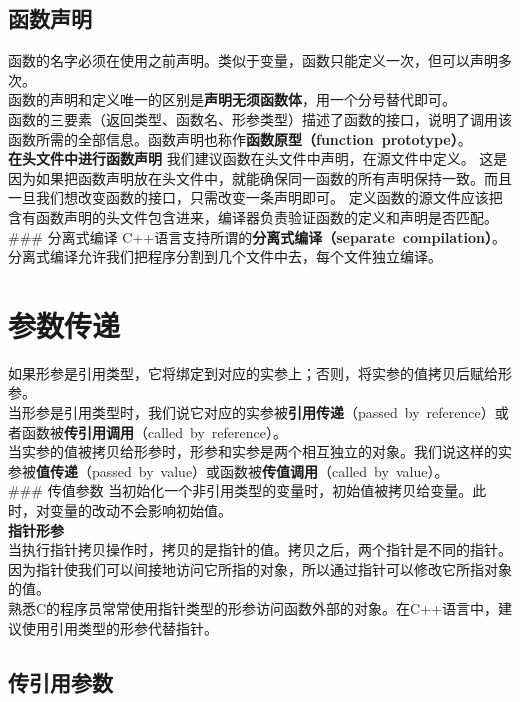 \documentclass[
  a4paper,
  oneside,tablecaptionabove
]{scrbook}
\begin{document}
\subsection{函数声明}\label{ux51fdux6570ux58f0ux660e}

函数的名字必须在使用之前声明。类似于变量，函数只能定义一次，但可以声明多次。\\
函数的声明和定义唯一的区别是\textbf{声明无须函数体}，用一个分号替代即可。\\
函数的三要素（返回类型、函数名、形参类型）描述了函数的接口，说明了调用该函数所需的全部信息。函数声明也称作\textbf{函数原型（function~prototype）}。\\
\textbf{在头文件中进行函数声明}
我们建议函数在头文件中声明，在源文件中定义。
这是因为如果把函数声明放在头文件中，就能确保同一函数的所有声明保持一致。而且一旦我们想改变函数的接口，只需改变一条声明即可。
定义函数的源文件应该把含有函数声明的头文件包含进来，编译器负责验证函数的定义和声明是否匹配。\\
\#\#\# 分离式编译
C++语言支持所谓的\textbf{分离式编译（separate~compilation）}。分离式编译允许我们把程序分割到几个文件中去，每个文件独立编译。

\section{参数传递}\label{ux53c2ux6570ux4f20ux9012}

如果形参是引用类型，它将绑定到对应的实参上；否则，将实参的值拷贝后赋给形参。\\
当形参是引用类型时，我们说它对应的实参被\textbf{引用传递}（passed~by~reference）或者函数被\textbf{传引用调用}（called~by~reference）。\\
当实参的值被拷贝给形参时，形参和实参是两个相互独立的对象。我们说这样的实参被\textbf{值传递}（passed~by~value）或函数被\textbf{传值调用}（called~by~value）。\\
\#\#\# 传值参数
当初始化一个非引用类型的变量时，初始值被拷贝给变量。此时，对变量的改动不会影响初始值。\\
\textbf{指针形参}\\
当执行指针拷贝操作时，拷贝的是指针的值。拷贝之后，两个指针是不同的指针。因为指针使我们可以间接地访问它所指的对象，所以通过指针可以修改它所指对象的值。\\
熟悉C的程序员常常使用指针类型的形参访问函数外部的对象。在C++语言中，建议使用引用类型的形参代替指针。

\subsection{传引用参数}\label{ux4f20ux5f15ux7528ux53c2ux6570}
\end{document}

